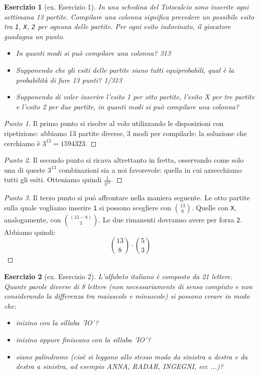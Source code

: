 \documentclass[12pt]{article}
\newtheorem{theorem}{Esercizio}
\renewcommand\qedsymbol{$\square$}
\begin{document}
\begin{theorem}[ex. Esercizio 1]
	In una schedina del Totocalcio sono inserite ogni settimana 13 partite. Compilare una colonna significa prevedere un possibile esito tra \verb=1=, \verb=X=, \verb=2= per ognuna delle partite. Per ogni esito indovinato, il giocatore guadagna un punto.
	\begin{itemize}
		\item In quanti modi si può compilare una colonna? 313
		\item Supponendo che gli esiti delle partite siano tutti equiprobabili, qual è la probabilità di fare 13 punti? 1/313
		\item Supponendo di voler inserire l’esito 1 per otto partite, l’esito X per tre partite e l’esito 2 per due partite, in quanti modi si può compilare una colonna?
	\end{itemize}
\end{theorem}

\begin{proof}[Punto 1]
	Il primo punto si risolve al volo utilizzando le disposizioni con ripetizione: abbiamo 13 partite diverse, 3 modi per compilarle: la soluzione che cerchiamo è $3^{13} = 1594323$.
\end{proof}

\renewcommand\qedsymbol{$\blacksquare$}

\begin{proof}[Punto 2]
	Il secondo punto si ricava altrettanto in fretta, osservando come solo una di queste $3^{13}$ combinazioni sia a noi favorevole: quella in cui azzecchiamo tutti gli esiti. Otteniamo quindi $\frac{1}{3^{13}}$.
\end{proof}
\begin{proof}[Punto 3]
	Il terzo punto si può affrontare nella maniera seguente. Le otto partite sulla quale vogliamo inserire \verb=1= si possono scegliere con $\binom{13}{8}$. Quelle con \verb=X=, analogamente, con $\binom{(13 - 8)}{3}$. Le due rimanenti dovranno avere per forza \verb=2=. Abbiamo quindi:
	\[
		\binom{13}{8} \cdot \binom{5}{3}
    \]
\end{proof}

\renewcommand\qedsymbol{$\square$}

\begin{theorem}[ex. Esercizio 2]
	L’alfabeto italiano è composto da 21 lettere. Quante parole diverse di 8 lettere (non necessariamente di senso compiuto e non considerando la differenza tra maiuscole e minuscole) si possono creare in modo che:
	\begin{itemize}
		\item inizino con la sillaba 'IO'?
		\item inizino oppure finiscano con la sillaba 'IO'?
		\item siano palindrome (cioè si leggono allo stesso modo da sinistra a destra e da destra a sinistra, ad esempio ANNA, RADAR, INGEGNI, ecc ...)?
	\end{itemize}
\end{theorem}
\end{document}
